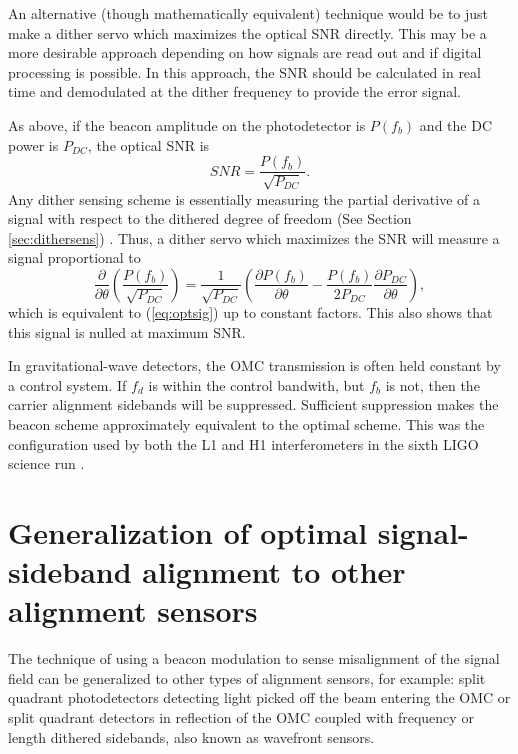 An alternative (though mathematically equivalent) technique would be to just make a dither servo which maximizes the optical SNR directly. %
This may be a more desirable approach depending on how signals are read out and if digital processing is possible. %
In this approach, the SNR should be calculated in real time and demodulated at the dither frequency to provide the error signal.

As above, if the beacon amplitude on the photodetector is $P(f_b)$ and the DC power is $P_{DC}$, the optical SNR is
%
\begin{equation}
SNR = \frac{P(f_b)}{\sqrt{P_{DC}}}.
\end{equation}
%
Any dither sensing scheme is essentially measuring the partial derivative of a signal with respect to the dithered degree of freedom (See Section \ref{sec:dithersens}) \cite{Kawabe:94}. %
Thus, a dither servo which maximizes the SNR will measure a signal proportional to
%
\begin{equation}
\frac{\partial}{\partial \theta} \left( \frac{P(f_b)}{\sqrt {P_{DC}} } \right) = \frac{1}{\sqrt {P_{DC}}} \left( \frac{\partial P(f_b)}{\partial \theta} - \frac{P(f_b)}{2P_{DC}} \frac{\partial P_{DC}}{\partial \theta} \right),
\end{equation}
%
which is equivalent to (\ref{eq:optsig}) up to constant factors. %
This also shows that this signal is nulled at maximum SNR.

In gravitational-wave detectors, the OMC transmission is often held constant by a control system. %
If $f_d$ is within the control bandwith, but $f_b$ is not, then the carrier alignment sidebands will be suppressed. %
Sufficient suppression makes the beacon scheme approximately equivalent to the optimal scheme. %
This was the configuration used by both the L1 and H1 interferometers in the sixth LIGO science run \cite{Tobin}.

\section{Generalization of optimal signal-sideband alignment to other alignment sensors}

The technique of using a beacon modulation to sense misalignment of the signal field can be generalized to other types of alignment sensors, for example: split quadrant photodetectors detecting light picked off the beam entering the OMC or split quadrant detectors in reflection of the OMC coupled with frequency or length dithered sidebands, also known as wavefront sensors.

